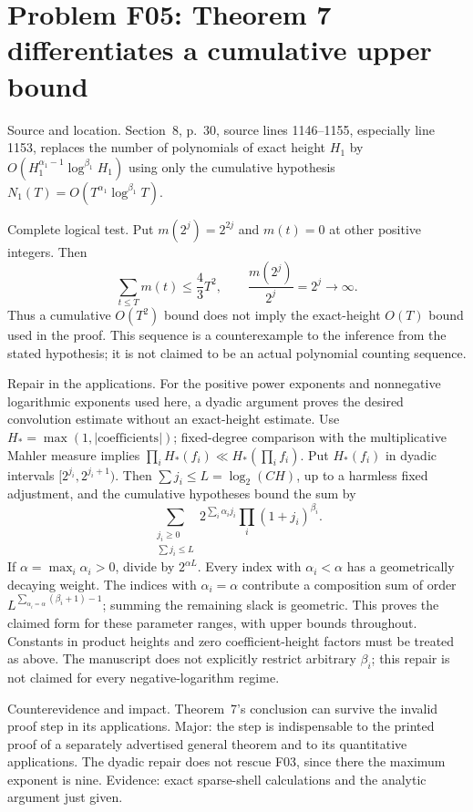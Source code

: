 \documentclass[10pt]{article}
\begin{document}
\section*{Problem F05: Theorem 7 differentiates a cumulative upper bound}
Source and location. Section 8, p. 30, source lines 1146–1155, especially line 1153, replaces the number of polynomials of exact height \(H_1\) by \(O(H_1^{\alpha_1-1}\log^{\beta_1}H_1)\) using only the cumulative hypothesis \(N_1(T)=O(T^{\alpha_1}\log^{\beta_1}T)\).\par
Complete logical test. Put \(m(2^j)=2^{2j}\) and \(m(t)=0\) at other positive integers. Then \[\sum_{t\le T}m(t)\le\frac43T^2,
 \qquad \frac{m(2^j)}{2^j}=2^j\longrightarrow\infty.\] Thus a cumulative \(O(T^2)\) bound does not imply the exact-height \(O(T)\) bound used in the proof. This sequence is a counterexample to the inference from the stated hypothesis; it is not claimed to be an actual polynomial counting sequence.\par
Repair in the applications. For the positive power exponents and nonnegative logarithmic exponents used here, a dyadic argument proves the desired convolution estimate without an exact-height estimate. Use \(H_*=\max(1,|\text{coefficients}|)\); fixed-degree comparison with the multiplicative Mahler measure implies \(\prod_i H_*(f_i)\ll H_*(\prod_i f_i)\). Put \(H_*(f_i)\) in dyadic intervals \([2^{j_i},2^{j_i+1})\). Then \(\sum j_i\le L=\log_2(CH)\), up to a harmless fixed adjustment, and the cumulative hypotheses bound the sum by \[\sum_{\substack{j_i\ge0\\\sum j_i\le L}}
 2^{\sum_i\alpha_i j_i}\prod_i(1+j_i)^{\beta_i}.\] If \(\alpha=\max_i\alpha_i>0\), divide by \(2^{\alpha L}\). Every index with \(\alpha_i<\alpha\) has a geometrically decaying weight. The indices with \(\alpha_i=\alpha\) contribute a composition sum of order \(L^{\sum_{\alpha_i=\alpha}(\beta_i+1)-1}\); summing the remaining slack is geometric. This proves the claimed form for these parameter ranges, with upper bounds throughout. Constants in product heights and zero coefficient-height factors must be treated as above. The manuscript does not explicitly restrict arbitrary \(\beta_i\); this repair is not claimed for every negative-logarithm regime.\par
Counterevidence and impact. Theorem 7’s conclusion can survive the invalid proof step in its applications. Major: the step is indispensable to the printed proof of a separately advertised general theorem and to its quantitative applications. The dyadic repair does not rescue F03, since there the maximum exponent is nine. Evidence: exact sparse-shell calculations and the analytic argument just given.\par
\end{document}
